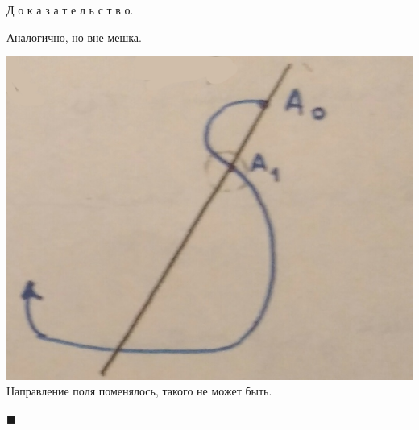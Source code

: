 \documentclass[oneside, final, 12pt]{article}
\theoremstyle{def}
\theoremstyle{th}
\theoremstyle{rem}
\renewenvironment{proof}{\par Д о к а з а т е л ь с т в о.}{\hfill$\blacksquare$}
\numberwithin{figure}{section}
\numberwithin{equation}{section}
\begin{document}
\begin{proof}
\begin{minipage}{0.32\textwidth}
				\qquad \qquad  Аналогично, \newline \hspace*{13mm} но вне мешка. \newline
		\end{minipage}
		\begin{minipage}{0.31\textwidth}
			\begin{center} \includegraphics[width=1\textwidth]{pict/pict_2_3.png} 
				Направление поля  \newline поменялось, такого \newline не может быть. \end{center} 
		\end{minipage}		
		
	\end{proof}
\end{document}
